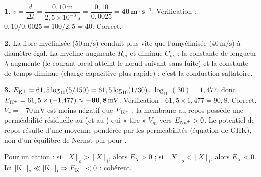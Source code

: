 \documentclass[11pt]{article}
\begin{document}
\begin{corrige}
\textbf{1.} $v = \dfrac{d}{\Delta t} = \dfrac{0,10\,\text{m}}{2,5\times 10^{-3}\,\text{s}} = \dfrac{0,10}{0,0025} = \mathbf{40\,\text{m}\cdot\text{s}^{-1}}$.
Vérification : $0,10/0,0025 = 100/2,5 = 40$. Correct.

\textbf{2.} La fibre myélinisée ($50\,\text{m/s}$) conduit plus vite que l'amyélinisée ($40\,\text{m/s}$) à diamètre égal. La myéline augmente $R_m$ et diminue $C_m$ : la constante de longueur $\lambda$ augmente (le courant local atteint le nœud suivant sans fuite) et la constante de temps diminue (charge capacitive plus rapide) : c'est la conduction saltatoire.

\textbf{3.} $E_{\ce{K+}} = 61,5 \log_{10}(5/150) = 61,5 \log_{10}(1/30)$.
$\log_{10}(30) = 1{,}477$, donc $E_{\ce{K+}} = 61,5 \times (-1{,}477) \approx \mathbf{-90,8\,\text{mV}}$.
Vérification : $61,5 \times 1{,}477 = 90,8$. Correct.
$V_r = -70\,\text{mV}$ est moins négatif que $E_{\ce{K+}}$ : la membrane au repos possède une perméabilité résiduelle au  (et au ) qui « tire » $V_m$ vers $E_{\ce{Na+}} > 0$. Le potentiel de repos résulte d'une moyenne pondérée par les perméabilités (équation de GHK), non d'un équilibre de Nernst pur pour .

\begin{methode}
Pour un cation : si $[X]_o > [X]_i$, alors $E_X > 0$ ; si $[X]_o < [X]_i$, alors $E_X < 0$. Ici ${[\ce{K+}]}_{o} \ll {[\ce{K+}]}_{i} \Rightarrow E_{\ce{K+}} < 0$ : cohérent.
\end{methode}
\end{corrige}
\end{document}
